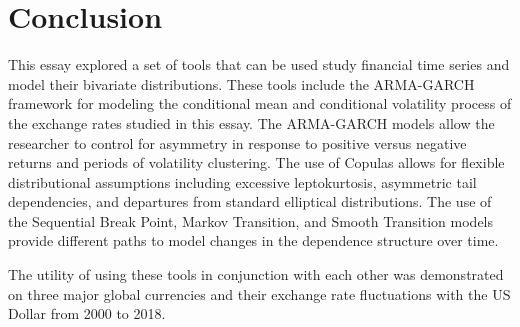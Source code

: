 \section{Conclusion} \label{sec:Copula_Conclusion}

This essay explored a set of tools that can be used study financial time series and model their bivariate distributions. These tools include the ARMA-GARCH framework for modeling the conditional mean and conditional volatility process of the exchange rates studied in this essay. The ARMA-GARCH models allow the researcher to control for asymmetry in response to positive versus negative returns and periods of volatility clustering. The use of Copulas allows for flexible distributional assumptions including excessive leptokurtosis, asymmetric tail dependencies, and departures from standard elliptical distributions. The use of the Sequential Break Point, Markov Transition, and Smooth Transition models provide different paths to model changes in the dependence structure over time. 

The utility of using these tools in conjunction with each other was demonstrated on three major global currencies and their exchange rate fluctuations with the US Dollar from 2000 to 2018.


